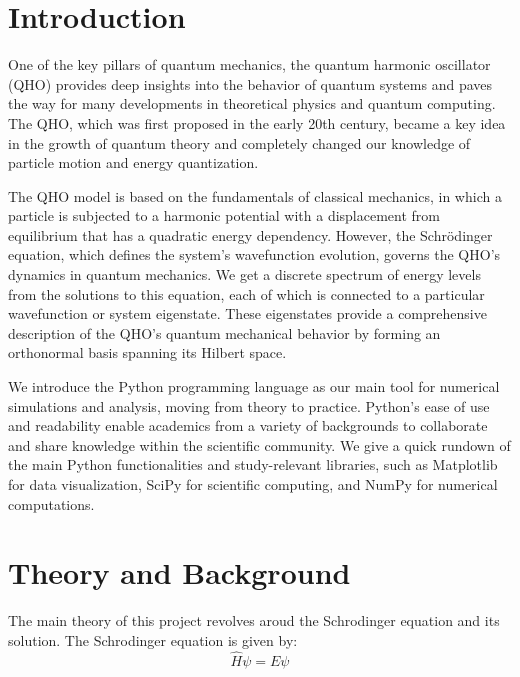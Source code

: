 \documentclass{article}
\begin{document}
\begin{multicols}{2}






\section{\label{intro}Introduction}
One of the key pillars of quantum mechanics, the quantum harmonic oscillator (QHO) provides deep insights into the behavior of quantum systems and paves the way for many developments in theoretical physics and quantum computing. The QHO, which was first proposed in the early 20th century, became a key idea in the growth of quantum theory and completely changed our knowledge of particle motion and energy quantization.

The QHO model is based on the fundamentals of classical mechanics, in which a particle is subjected to a harmonic potential with a displacement from equilibrium that has a quadratic energy dependency. However, the Schrödinger equation, which defines the system's wavefunction evolution, governs the QHO's dynamics in quantum mechanics. We get a discrete spectrum of energy levels from the solutions to this equation, each of which is connected to a particular wavefunction or system eigenstate. These eigenstates provide a comprehensive description of the QHO's quantum mechanical behavior by forming an orthonormal basis spanning its Hilbert space.

We introduce the Python programming language as our main tool for numerical simulations and analysis, moving from theory to practice. Python's ease of use and readability enable academics from a variety of backgrounds to collaborate and share knowledge within the scientific community. We give a quick rundown of the main Python functionalities and study-relevant libraries, such as Matplotlib for data visualization, SciPy for scientific computing, and NumPy for numerical computations.
\section{\label{theory}Theory and Background}

The main theory of this project revolves aroud the Schrodinger equation and its solution. The Schrodinger equation is given by:
\begin{equation}
    \hat{H}\psi = E\psi
\end{equation}


\end{multicols}
\end{document}
